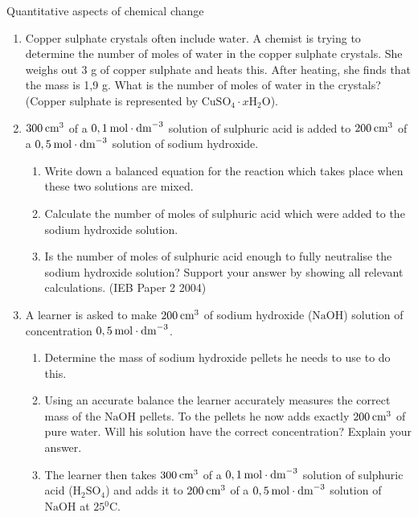 \begin{eocexercises}{Quantitative aspects of chemical change}
\begin{enumerate}[noitemsep, label=\textbf{\arabic*}. ]
                \item Copper sulphate crystals often include water. A chemist is trying to determine the number of moles of water in the copper sulphate crystals. She weighs out 3 g of copper sulphate and heats this. After heating, she finds that the mass is 1,9 g. What is the number of moles of water in the crystals? (Copper sulphate is represented by ${\text{CuSO}}_{4}\cdot x{\text{H}}_{2}\text{O}$).        
\label{m38712*uid147}\item $300\phantom{\rule{2pt}{0ex}}{\text{cm}}^{3}$ of a $0,1\phantom{\rule{2pt}{0ex}}\text{mol}\ensuremath{\cdot}{\text{dm}}^{-3}$ solution of sulphuric acid is added to $200\phantom{\rule{2pt}{0ex}}{\text{cm}}^{3}$ of a $0,5\phantom{\rule{2pt}{0ex}}\text{mol}\ensuremath{\cdot}{\text{dm}}^{-3}$ solution of sodium hydroxide.
\label{m38712*id286663}\begin{enumerate}[noitemsep, label=\textbf{\alph*}. ] 
            \label{m38712*uid148}\item Write down a balanced equation for the reaction which takes place when these two solutions are mixed.
\label{m38712*uid149}\item Calculate the number of moles of sulphuric acid which were added to the sodium hydroxide solution.
\label{m38712*uid150}\item Is the number of moles of sulphuric acid enough to fully neutralise the sodium hydroxide solution? Support your answer by showing all relevant calculations.
(IEB Paper 2 2004)
\end{enumerate}
                \label{m38712*uid155}\item A learner is asked to make $200\phantom{\rule{2pt}{0ex}}{\text{cm}}^{3}$ of sodium hydroxide ($\text{NaOH}$) solution of concentration $0,5\phantom{\rule{2pt}{0ex}}\text{mol}\ensuremath{\cdot}{\text{dm}}^{-3}$.
\label{m38712*id286969}\begin{enumerate}[noitemsep, label=\textbf{\alph*}. ] 
            \label{m38712*uid156}\item Determine the mass of sodium hydroxide pellets he needs to use to do this.
\label{m38712*uid157}\item Using an accurate balance the learner accurately measures the correct mass of the $\text{NaOH}$ pellets. To the pellets he now adds exactly $200\phantom{\rule{2pt}{0ex}}{\text{cm}}^{3}$ of pure water. Will his solution have the correct concentration? Explain your answer.\item The learner then takes $300\phantom{\rule{2pt}{0ex}}{\text{cm}}^{3}$ of a $0,1\phantom{\rule{2pt}{0ex}}\text{mol}\ensuremath{\cdot}{\text{dm}}^{-3}$ solution of sulphuric acid ($\text{H}{}_{2}\text{SO}{}_{4}$) and adds it to $200\phantom{\rule{2pt}{0ex}}{\text{cm}}^{3}$ of a $0,5\phantom{\rule{2pt}{0ex}}\text{mol}\ensuremath{\cdot}{\text{dm}}^{-3}$ solution of $\text{NaOH}$ at $25{}^{0}\text{C}$.

\end{enumerate}
\end{enumerate}
\end{eocexercises}
